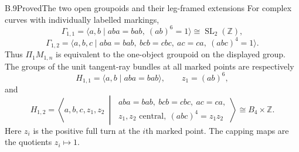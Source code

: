 \begin{result}{B.9}{Proved}{The two open groupoids and their leg-framed extensions}
For complex curves with individually labelled markings,
\[
 \Gamma_{1,1}=\langle a,b\mid aba=bab,\ (ab)^6=1\rangle
                 \cong\operatorname{SL}_2(\mathbb Z),
 \tag{B.8}
\]
\[
 \Gamma_{1,2}=\langle a,b,c\mid aba=bab,\ bcb=cbc,
               \ ac=ca,\ (abc)^4=1\rangle.
 \tag{B.9}
\]
Thus $\Pi_1M_{1,n}$ is equivalent to the one-object groupoid on the
displayed group.  The groups of the unit tangent-ray bundles at
all marked points are respectively
\[
 H_{1,1}=\langle a,b\mid aba=bab\rangle,
       \qquad z_1=(ab)^6,
 \tag{B.10}
\]
and
\[
 H_{1,2}=\left\langle a,b,c,z_1,z_2\ \middle|\
 \begin{array}{l}
 aba=bab,\ bcb=cbc,\ ac=ca,\\
 z_1,z_2\text{ central},\ (abc)^4=z_1z_2
 \end{array}\right\rangle
 \cong B_4\times\mathbb Z.
 \tag{B.11}
\]
Here $z_i$ is the positive full turn at the $i$th marked point.
The capping maps are the quotients $z_i\mapsto1$.
\end{result}

